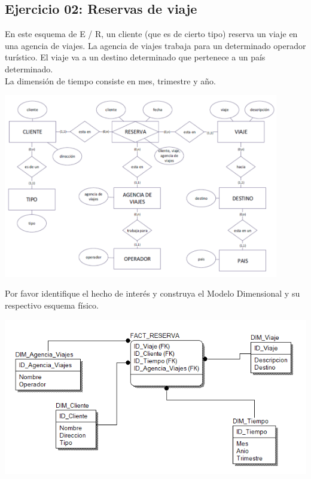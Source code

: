 \documentclass[12pt,letterpaper]{article}
\begin{document}
\subsection{Ejercicio 02: Reservas de viaje}
En este esquema de E / R, un cliente (que es de cierto tipo) reserva un viaje en una agencia de viajes. La agencia de viajes
trabaja para un determinado operador turístico. El viaje va a un destino determinado que pertenece a un país determinado.
\\La dimensión de tiempo consiste en mes, trimestre y año.
\begin{center}
    \includegraphics[width=12cm]{img/ejer2.png}  
\end{center}
Por favor identifique el hecho de interés y construya el Modelo Dimensional y su respectivo esquema físico.
\begin{center}
    \includegraphics[width=15cm]{img/2.png}  
\end{center}
\end{document}
